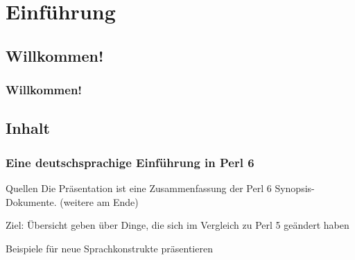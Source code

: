 \section{Einführung}

\subsection{Willkommen!}
\begin{frame}
	\frametitle{Willkommen!}
	\titlepage
\end{frame}




\subsection{Inhalt}
\begin{frame}
	\frametitle{Eine deutschsprachige Einführung in Perl 6}

	\begin{block}{Quellen}
	Die Präsentation ist eine Zusammenfassung der Perl 6 Synopsis-Dokumente.
	(weitere am Ende)
	\end{block}

	\pause
	
	\begin{block}{Ziel: Übersicht geben}
	über Dinge, die sich im Vergleich zu Perl 5 geändert haben
	\end{block}

	\pause
	
	\begin{block}{Beispiele}
	für neue Sprachkonstrukte präsentieren
	\end{block}

\end{frame}


% 
% 	

